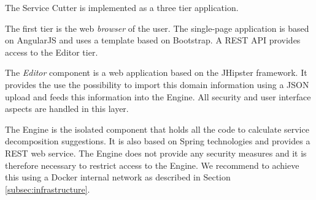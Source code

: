 \begin{minipage}[t]{0.5\textwidth}
\setlength{\parskip}{5pt plus 0.1pt}
	The Service Cutter is implemented as a three tier application.
	
	The first tier is the web \textit{browser} of the user. The single-page application is based on AngularJS\cite{angularjs} and uses a template based on Bootstrap\cite{bootstrap}. A REST API provides access to the Editor tier.
	
	The \textit{Editor} component is a web application based on the JHipster\cite{jhipster} framework. It provides the use the possibility to import this domain information using a JSON upload and feeds this information into the Engine. All security and user interface aspects are handled in this layer.
	
	The Engine is the isolated component that holds all the code to calculate service decomposition suggestions. It is also based on Spring technologies and provides a REST web service. The Engine does not provide any security measures and it is therefore necessary to restrict access to the Engine. We recommend to achieve this using a Docker\cite{docker} internal network as described in Section \ref{subsec:infrastructure}.
	
	
\end{minipage}
